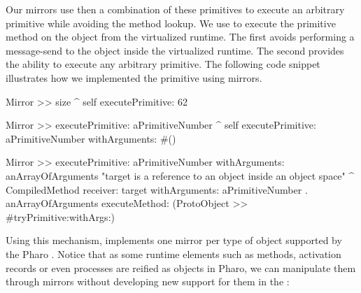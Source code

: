 Our mirrors use then a combination of these primitives to execute an arbitrary primitive while avoiding the method lookup. We use  to execute the primitive method  on the object from the virtualized runtime. The first avoids performing a message-send to the object inside the virtualized runtime. The second provides the ability to execute any arbitrary primitive. The following code snippet illustrates how we implemented the  primitive using mirrors.

\begin{code}
Mirror >> size
    ^ self executePrimitive: 62

Mirror >> executePrimitive: aPrimitiveNumber 
    ^ self executePrimitive: aPrimitiveNumber withArguments: #()
    
Mirror >> executePrimitive: aPrimitiveNumber withArguments: anArrayOfArguments
    "target is a reference to an object inside an object space"
    ^ CompiledMethod
           receiver: target
           withArguments: { aPrimitiveNumber . anArrayOfArguments }
           executeMethod: (ProtoObject >> #tryPrimitive:withArgs:)
\end{code}

Using this mechanism, \Vtt implements one mirror per type of object supported by the Pharo \VM. Notice that as some runtime elements such as methods, activation records or even processes are reified as objects in Pharo, we can manipulate them through mirrors without developing new support for them in the \VM:

